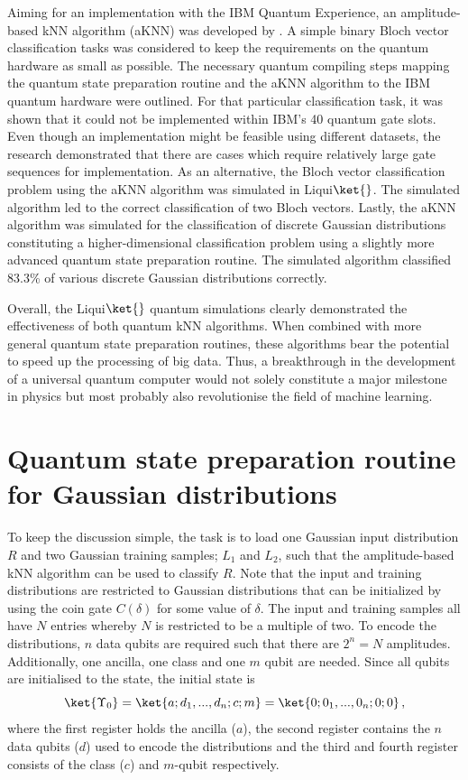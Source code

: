 Aiming for an implementation with the IBM Quantum Experience, an amplitude-based kNN algorithm (aKNN) was developed by .  A simple binary Bloch vector classification tasks was considered to keep the requirements on the quantum hardware as small as possible. The necessary quantum compiling steps mapping the quantum state preparation routine and the aKNN algorithm to the IBM quantum hardware were outlined. For that particular classification task, it was shown that it could not be implemented within IBM's 40 quantum gate slots. Even though an implementation might be feasible using different datasets, the research demonstrated that there are cases which require relatively large gate sequences for implementation. As an alternative, the Bloch vector classification problem using the aKNN algorithm was simulated in Liqui$\ket{}$. The simulated algorithm led to the correct classification of two Bloch vectors. Lastly, the aKNN algorithm was simulated for the classification of discrete Gaussian distributions constituting a higher-dimensional classification problem using a slightly more advanced quantum state preparation routine. The simulated algorithm classified 83.3\% of various discrete Gaussian distributions correctly.

Overall, the Liqui$\ket{}$ quantum simulations clearly demonstrated the effectiveness of both quantum kNN algorithms. When combined with more general quantum state preparation routines, these algorithms bear the potential to speed up the processing of big data. Thus, a breakthrough in the development of a universal quantum computer would not solely constitute a major milestone in physics but most probably also revolutionise the field of machine learning.
\chapter{Quantum state preparation routine for Gaussian distributions}\label{sec:stateprepgaussian}

To keep the discussion simple, the task is to load one Gaussian input distribution $R$ and two Gaussian training samples; $L_1$ and $L_2$, such that the amplitude-based kNN algorithm can be used to classify $R$. Note that the input and training distributions are restricted to Gaussian distributions that can be initialized by using the coin gate $C(\delta)$ for some value of $\delta$. The input and training samples all have $N$ entries whereby $N$ is restricted to be a multiple of two. To encode the distributions, $n$ data qubits are required such that there are $2^n = N$ amplitudes. Additionally, one ancilla, one class and one $m$ qubit are needed. Since all qubits are initialised to the \0 state, the initial state is 
\begin{equation}
\ket{\Upsilon_0} = \ket{a;d_1,...,d_n;c;m} = \ket{0;0_1,...,0_n;0;0}\, ,
\end{equation}
where the first register holds the ancilla ($a$), the second register contains the $n$ data qubits ($d$) used to encode the distributions and the third and fourth register consists of the class ($c$) and $m$-qubit respectively.

